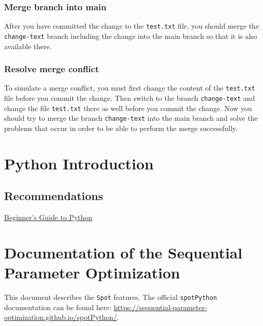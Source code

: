 \documentclass[
  letterpaper,
  DIV=11,
  numbers=noendperiod]{scrreprt}
\begin{document}
\hypertarget{merge-branch-into-main}{%
\subsection{Merge branch into main}\label{merge-branch-into-main}}

After you have committed the change to the \texttt{test.txt} file, you
should merge the \texttt{change-text} branch including the change into
the main branch so that it is also available there.

\hypertarget{resolve-merge-conflict}{%
\subsection{Resolve merge conflict}\label{resolve-merge-conflict}}

To simulate a merge conflict, you must first change the content of the
\texttt{test.txt} file before you commit the change. Then switch to the
branch \texttt{change-text} and change the file \texttt{test.txt} there
as well before you commit the change. Now you should try to merge the
branch \texttt{change-text} into the main branch and solve the problems
that occur in order to be able to perform the merge successfully.

\hypertarget{python-introduction}{%
\chapter{Python Introduction}\label{python-introduction}}

\hypertarget{recommendations}{%
\section{Recommendations}\label{recommendations}}

\href{https://wiki.python.org/moin/BeginnersGuide}{Beginner's Guide to
Python}

\hypertarget{documentation-of-the-sequential-parameter-optimization}{%
\chapter{Documentation of the Sequential Parameter
Optimization}\label{documentation-of-the-sequential-parameter-optimization}}

This document describes the \texttt{Spot} features. The official
\texttt{spotPython} documentation can be found here:
\url{https://sequential-parameter-optimization.github.io/spotPython/}.
\end{document}
